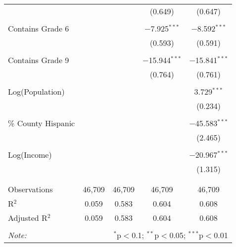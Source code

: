 \begin{table}[!htbp]
\begin{tabular}{@{\extracolsep{-2pt}}lcccc}
  &  &  & (0.649) & (0.647) \\ 
  & & & & \\ 
 Contains Grade 6 &  &  & $-$7.925$^{***}$ & $-$8.592$^{***}$ \\ 
  &  &  & (0.593) & (0.591) \\ 
  & & & & \\ 
 Contains Grade 9 &  &  & $-$15.944$^{***}$ & $-$15.841$^{***}$ \\ 
  &  &  & (0.764) & (0.761) \\ 
  & & & & \\ 
 Log(Population) &  &  &  & 3.729$^{***}$ \\ 
  &  &  &  & (0.234) \\ 
  & & & & \\ 
 \% County Hispanic &  &  &  & $-$45.583$^{***}$ \\ 
  &  &  &  & (2.465) \\ 
  & & & & \\ 
 Log(Income) &  &  &  & $-$20.967$^{***}$ \\ 
  &  &  &  & (1.315) \\ 
  & & & & \\ 
\hline \\[-1.8ex] 
Observations & 46,709 & 46,709 & 46,709 & 46,709 \\ 
R$^{2}$ & 0.059 & 0.583 & 0.604 & 0.608 \\ 
Adjusted R$^{2}$ & 0.059 & 0.583 & 0.604 & 0.608 \\ 
\hline 
\hline \\[-1.8ex] 
\textit{Note:}  & \multicolumn{4}{r}{$^{*}$p$<$0.1; $^{**}$p$<$0.05; $^{***}$p$<$0.01} \\ 
\end{tabular} 
\end{table} 

